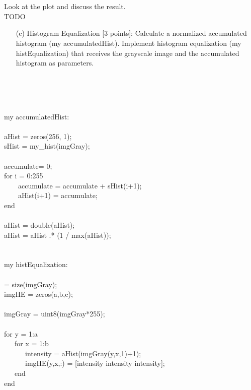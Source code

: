{{    }\\ \
    \raggedright{ Look at the plot and discuss the result.
    \\TODO
    }
\pagebreak
    \begin{enumerate}        
        \item[(c)] {Histogram Equalization [3 points]: Calculate a normalized accumulated histogram (my accumulatedHist). Implement histogram equalization (my histEqualization) that receives the grayscale image and the accumulated histogram as parameters.}
    \end{enumerate}
    \\ \ \\
    \raggedright{
    \\ my accumulatedHist:
    \\ \ \\ aHist = zeros(256, 1);
    \\ sHist = my_hist(imgGray);
    \\
    \\ accumulate= 0;
    \\ for i = 0:255
    \\ \ \ \ \ accumulate = accumulate + sHist(i+1);
    \\ \ \ \ \ aHist(i+1) = accumulate;
    \\ end
    \\
    \\ aHist = double(aHist);
    \\ aHist = aHist .* (1 / max(aHist));
    \\ \ \\
    \\   my histEqualization:
    \\
    \\  [a,b,c] = size(imgGray);
    \\ imgHE = zeros(a,b,c);
    \\
    \\ imgGray = uint8(imgGray*255);
    \\
    \\  for y = 1:a
    \\  \ \ \ for x = 1:b
    \\  \ \ \ \ \ \    intensity = aHist(imgGray(y,x,1)+1);
    \\  \ \ \ \ \ \    imgHE(y,x,:) = [intensity intensity intensity];
    \\  \ \ \  end
    \\ end \\
    }
\pagebreak
\centering{
}}
